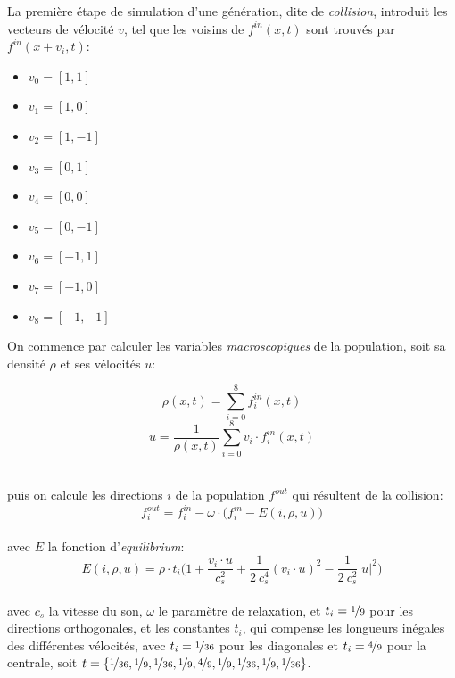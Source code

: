 La première étape de simulation d'une génération, dite de \textit{collision}, introduit les vecteurs de vélocité $v$,  tel que les voisins de $f^{in}(x, t)$ sont trouvés par $f^{in}(x+v_i,t)$: 
\begin{multicols}{3}
\begin{itemize}
\item[] $v_0 = [1,1]$
\item[] $v_1 = [1,0]$
\item[] $v_2 = [1,-1]$
\item[] $v_3 = [0,1]$
\item[] $v_4 = [0,0]$
\item[] $v_5 = [0,-1]$
\item[] $v_6 = [-1,1]$
\item[] $v_7 = [-1,0]$
\item[] $v_8 = [-1,-1]$
\end{itemize}
\end{multicols}

On commence par calculer les variables \textit{macroscopiques} de la population, soit sa densité $\rho$ et ses vélocités $u$:\\[-2\baselineskip]
\begin{multicols}{2}
\begin{equation}
\rho(x, t) = \sum_{i=0}^{8} f^{in}_i(x,t)
\end{equation}
\begin{equation}
u = \frac{1}{\rho(x,t)}\sum_{i=0}^{8} v_i \cdot f^{in}_i(x,t)
\end{equation}
\end{multicols}~\\[-0.5\baselineskip]
\noindent puis on calcule les directions $i$ de la population $f^{out}$ qui résultent de la collision:
\begin{equation}
f^{out}_i = f^{in}_i - \omega \cdot \big(f^{in}_i - E(i, \rho, u) \big)
\end{equation}\\[-\baselineskip]

\noindent avec $E$ la fonction d'\textit{equilibrium}:
\begin{equation}
E(i, \rho, u) = \rho\cdot t_i \bigg(  1 + \frac{v_i \cdot u}{c^2_s} + \frac{1}{2~c^4_s} (v_i \cdot u)^2 - \frac{1}{2~c^2_s} |u|^2 \bigg)
\end{equation}\\[-\baselineskip]

\noindent avec $c_s$ la vitesse du son, $\omega$ le paramètre de relaxation, et $t_i = \nicefrac{1}{9}$ pour les directions orthogonales, et les constantes $t_i$, qui compense les longueurs inégales des différentes vélocités, avec $t_i =\nicefrac{1}{36}$ pour les diagonales et $t_i=\nicefrac{4}{9}$ pour la centrale, soit $t = \{\nicefrac{1}{36} , \nicefrac{1}{9}, \nicefrac{1}{36}, \nicefrac{1}{9}, \nicefrac{4}{9}, \nicefrac{1}{9}, \nicefrac{1}{36}, \nicefrac{1}{9}, \nicefrac{1}{36}\}$.

